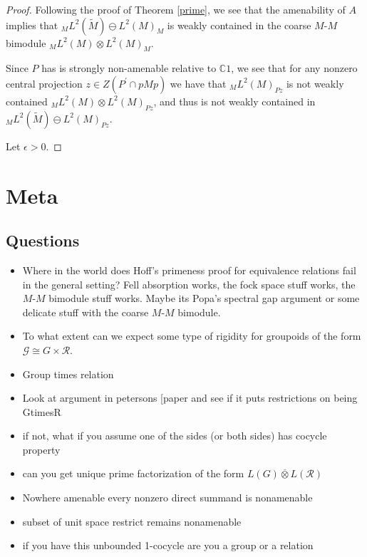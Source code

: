 \documentclass[a4paper,11pt]{article}
\numberwithin{equation}{section}
\theoremstyle{definition}
\theoremstyle{remark}
\numberwithin{equation}{section}
\newcommand{\rG}{\mathcal{G}}
\newcommand{\C}{\mathbb{C}}
\newcommand{\eps}{\epsilon}
\newcommand*\cls[1]{\overline{#1}}
\numberwithin{equation}{section}
\begin{document}
\begin{proof}
    Following the proof of Theorem \ref{prime}, we see that the amenability of $ A $ implies that $ _M L^{2}(\widetilde{M}) \ominus L^{2}(M)_{M} $ is weakly contained in the coarse $ M $-$ M $ bimodule $ _M L^{2}(M)\otimes L^{2}(M)_M $.

    Since $ P $ has is strongly non-amenable relative to $ \C1 $, we see that for any nonzero central projection $ z\in Z(P^{\prime}\cap pMp) $ we have that $ _M L^{2}(M)_{Pz} $ is not weakly contained $ _M L^{2}(M) \otimes L^{2}(M)_{Pz} $, and thus is not weakly contained in $ _M L^{2}(\widetilde{M}) \ominus L^{2}(M)_{Pz} $.

    Let $ \eps>0 $.
    
\end{proof}




\section{Meta}
\subsection{Questions}
\begin{itemize}
  \item Where in the world does Hoff's primeness proof for equivalence relations fail in the general setting? Fell absorption works, the fock space stuff works, the $ M $-$ M $ bimodule stuff works. Maybe its Popa's spectral gap argument or some delicate stuff with the coarse $ M $-$ M $ bimodule.
  \item To what extent can we expect some type of rigidity for groupoids of the form $ \rG \cong G \times \mathcal{R} $.
  \item Group times relation 
  \item Look at argument in petersons [paper and see if it puts restrictions on being GtimesR
  \item if not, what if you assume one of the sides (or both sides) has cocycle property
  \item can you get unique prime factorization of the form $ L(G) \cls{\otimes } L(\mathcal{R}) $
  \item Nowhere amenable every nonzero direct summand is nonamenable
  \item subset of unit space restrict remains nonamenable
  \item if you have this unbounded 1-cocycle are you a group or a relation
\end{itemize}
\end{document}
